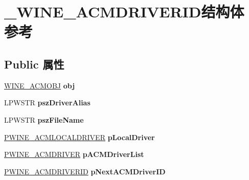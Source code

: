 \hypertarget{struct___w_i_n_e___a_c_m_d_r_i_v_e_r_i_d}{}\section{\+\_\+\+W\+I\+N\+E\+\_\+\+A\+C\+M\+D\+R\+I\+V\+E\+R\+I\+D结构体 参考}
\label{struct___w_i_n_e___a_c_m_d_r_i_v_e_r_i_d}
\subsection*{Public 属性}
\begin{DoxyCompactItemize}
\item 
\mbox{\label{struct___w_i_n_e___a_c_m_d_r_i_v_e_r_i_d_afca6f4b25fde7c2568979aaad78e9da6}} 
\hyperlink{struct___w_i_n_e___a_c_m_o_b_j}{W\+I\+N\+E\+\_\+\+A\+C\+M\+O\+BJ} {\bfseries obj}
\item 
\mbox{\label{struct___w_i_n_e___a_c_m_d_r_i_v_e_r_i_d_a107ef11f52fea290cbbf03374d727e8d}} 
L\+P\+W\+S\+TR {\bfseries psz\+Driver\+Alias}
\item 
\mbox{\label{struct___w_i_n_e___a_c_m_d_r_i_v_e_r_i_d_ae48891f35fa9e0df11090c91bc9eaa0f}} 
L\+P\+W\+S\+TR {\bfseries psz\+File\+Name}
\item 
\mbox{\label{struct___w_i_n_e___a_c_m_d_r_i_v_e_r_i_d_a07d8dd7620a6a86f09f11c127194e58a}} 
\hyperlink{struct___w_i_n_e___a_c_m_l_o_c_a_l_d_r_i_v_e_r}{P\+W\+I\+N\+E\+\_\+\+A\+C\+M\+L\+O\+C\+A\+L\+D\+R\+I\+V\+ER} {\bfseries p\+Local\+Driver}
\item 
\mbox{\label{struct___w_i_n_e___a_c_m_d_r_i_v_e_r_i_d_a1d842c5820bf8c6840f57b084a680ad0}} 
\hyperlink{struct___w_i_n_e___a_c_m_d_r_i_v_e_r}{P\+W\+I\+N\+E\+\_\+\+A\+C\+M\+D\+R\+I\+V\+ER} {\bfseries p\+A\+C\+M\+Driver\+List}
\item 
\mbox{\label{struct___w_i_n_e___a_c_m_d_r_i_v_e_r_i_d_a414830e54a832b4f8e57e3b642f8e3db}} 
\hyperlink{struct___w_i_n_e___a_c_m_d_r_i_v_e_r_i_d}{P\+W\+I\+N\+E\+\_\+\+A\+C\+M\+D\+R\+I\+V\+E\+R\+ID} {\bfseries p\+Next\+A\+C\+M\+Driver\+ID}

\end{DoxyCompactItemize}

